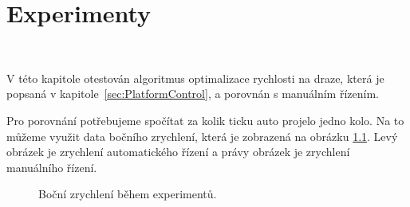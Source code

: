 \chapter{Experimenty}
\label{sec:Experiments}
\vspace{-20pt}
\

V této kapitole otestován algoritmus optimalizace rychlosti na draze, 
která je popsaná v kapitole~\ref{sec:PlatformControl}, a porovnán s manuálním
řízením. 

Pro porovnání potřebujeme spočítat za kolik ticku auto projelo jedno kolo. 
Na to můžeme využit data bočního zrychlení, která je zobrazená na obrázku \ref{fig:Laps}.
Levý obrázek je zrychlení automatického řízení a právy obrázek je zrychlení 
manuálního řízení.

\begin{figure}[!h]
    \centering
    \caption{Boční zrychlení během experimentů.}
    \label{fig:Laps}
\end{figure}

